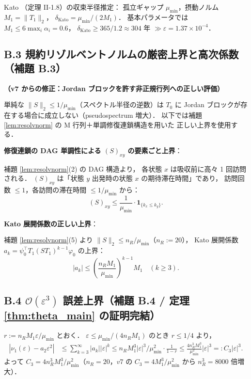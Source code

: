 \documentclass[12pt,a4paper]{article}
\theoremstyle{plain}
\theoremstyle{definition}
\theoremstyle{remark}
\newcommand{\calO}{\mathcal{O}}
\newcommand{\eps}{\varepsilon}
\newcommand{\RedRes}{S}
\begin{document}
Kato \cite{kato1995}（定理 II-1.8）の収束半径推定：
孤立ギャップ $\mu_{\min}$，摂動ノルム $M_1=\|T_1\|_2$，
$\delta_{\mathrm{Kato}} = \mu_{\min}/(2M_1)$．
基本パラメータでは $M_1\le6\max_i\alpha_i=0.6$，
$\delta_{\mathrm{Kato}}\ge365/1.2\approx304$ 年 $\gg\eps=1.37\times10^{-4}$．

\subsection*{B.3 規約リゾルベントノルムの厳密上界と高次係数（補題 B.3）}

\textbf{（v7 からの修正：Jordan ブロックを許す非正規行列への正しい評価）}

単純な $\|\RedRes\|_2\le1/\mu_{\min}$（スペクトル半径の逆数）は
$T_0$ に Jordan ブロックが存在する場合に成立しない（pseudospectrum 増大）．
以下では補題 \ref{lem:resolvnorm} の M 行列＋単調修復連鎖構造を用いた
正しい上界を使用する．

\textbf{修復連鎖の DAG 単調性による $(\RedRes)_{xy}$ の要素ごと上界}：

補題 \ref{lem:resolvnorm}(2) の DAG 構造より，
各状態 $x$ は吸収前に高々 1 回訪問される．
$(\RedRes)_{xy}$ は「状態 $y$ 出発時の状態 $x$ の期待滞在時間」であり，
訪問回数 $\le 1$，各訪問の滞在時間 $\le 1/\mu_{\min}$ から：
\begin{equation}
  (\RedRes)_{xy} \le \frac{1}{\mu_{\min}}\cdot\mathbf{1}_{\{k_x\le k_y\}}.
  \label{eq:Sxy_bound}
\end{equation}

\textbf{Kato 展開係数の正しい上界}：

補題 \ref{lem:resolvnorm}(5) より $\|\RedRes\|_2\le n_R/\mu_{\min}$（$n_R:=20$），
Kato 展開係数 $a_k=\psi_0^\top T_1(\RedRes T_1)^{k-1}\varphi_0$ の上界：
\begin{equation}
  |a_k| \le \left(\frac{n_R M_1}{\mu_{\min}}\right)^{k-1} M_1 \quad(k\ge3).
\end{equation}

\subsection*{B.4 $\calO(\eps^3)$ 誤差上界（補題 B.4 / 定理 \ref{thm:theta_main} の証明完結）}

$r := n_R M_1\eps/\mu_{\min}$ とおく．
$\eps\le\mu_{\min}/(4n_R M_1)$ のとき $r\le1/4$ より，
\begin{align}
  \left|\nu_1(\eps)-a_2\eps^2\right|
  &\le \sum_{k=3}^\infty|a_k||\eps|^k
   \le n_R M_1^3|\eps|^3/\mu_{\min}^2 \cdot \frac{1}{1-r}
   \le \frac{4n_R^3 M_1^3}{\mu_{\min}^2}|\eps|^3 =: C_3|\eps|^3.
\end{align}
よって $C_3=4n_R^3 M_1^3/\mu_{\min}^2$（$n_R=20$，$v7$ の $C_3=4M_1^3/\mu_{\min}^2$ から $n_R^3=8000$ 倍増大）．
\end{document}
